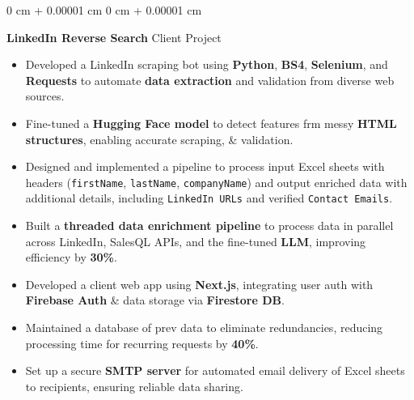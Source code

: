 \documentclass[10pt, letterpaper]{article}
\newenvironment{highlights}{
    \begin{itemize}[
        topsep=0.10 cm,
        parsep=0.10 cm,
        partopsep=0pt,
        itemsep=0pt,
        leftmargin=0 cm + 10pt
    ]
}{
    \end{itemize}
} %
\newenvironment{onecolentry}{
    \begin{adjustwidth}{
        0 cm + 0.00001 cm
    }{
        0 cm + 0.00001 cm
    }
}{
    \end{adjustwidth}
} %
\begin{document}
\begin{onecolentry}
	\textbf{LinkedIn Reverse Search} \hfill Client Project
	\begin{highlights}
		\item Developed a LinkedIn scraping bot using \textbf{Python}, \textbf{BS4}, \textbf{Selenium}, and \textbf{Requests} to automate \textbf{data extraction} and validation from diverse web sources.
		\item Fine-tuned a \textbf{Hugging Face model} to detect features frm messy \textbf{HTML structures}, enabling accurate scraping, \& validation.
		\item Designed and implemented a pipeline to process input Excel sheets with headers (\texttt{firstName}, \texttt{lastName}, \texttt{companyName}) and output enriched data with additional details, including \texttt{LinkedIn URLs} and verified \texttt{Contact Emails}.
		\item Built a \textbf{threaded data enrichment pipeline} to process data in parallel across LinkedIn, SalesQL APIs, and the fine-tuned \textbf{LLM}, improving efficiency by \textbf{30\%}.
		\item Developed a client web app using \textbf{Next.js}, integrating user auth with \textbf{Firebase Auth} \& data storage via \textbf{Firestore DB}.
		\item Maintained a database of prev data to eliminate redundancies, reducing processing time for recurring requests by \textbf{40\%}.
		\item Set up a secure \textbf{SMTP server} for automated email delivery of Excel sheets to recipients, ensuring reliable data sharing.
	\end{highlights}
\end{onecolentry}


\vspace{0.15 cm}
\end{document}
